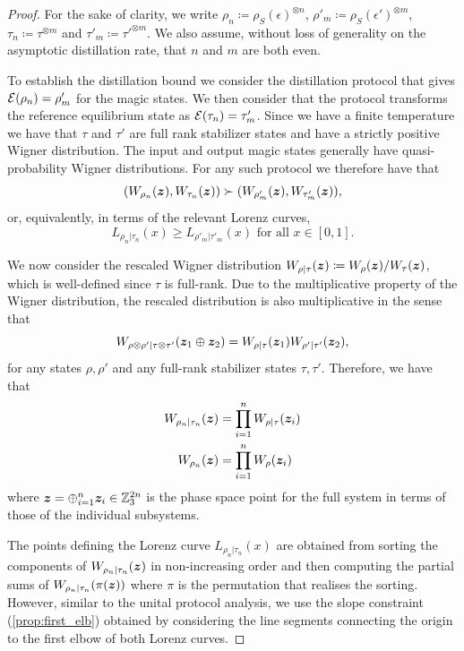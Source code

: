 \documentclass[pra,
aps,
twocolumn,
superscriptaddress,
groupedaddress,
nofootinbib,
reprint
]{revtex4-1}
\begin{document}
\begin{proof}	\label{thm:free-energy-bound-proof}
For the sake of clarity, we write $\rho_n \coloneqq \rho_S(\epsilon)^{\otimes n}$, $\rho'_m \coloneqq \rho_S(\epsilon')^{\otimes m}$, $\tau_n \coloneqq \tau^{\otimes m}$ and $\tau'_m \coloneqq \tau'^{\otimes m}$.  We also assume, without loss of generality on the asymptotic distillation rate, that $n$ and $m$ are both even.

To establish the distillation bound we consider the distillation protocol that gives ${\mathcal E}( \rho_n) = \rho'_m$ for the magic states. 
We then consider that the protocol transforms the reference equilibrium state as ${\mathcal E}( \tau_n) = \tau'_m$.
Since we have a finite temperature we have that $\tau$ and $\tau'$ are full rank stabilizer states and have a strictly positive Wigner distribution. The input and output magic states generally have quasi-probability Wigner distributions. 
For any such protocol we therefore have that
\begin{equation}
	( W_{\rho_n}(\bm{z}), W_{\tau_n}(\bm{z}) ) \succ ( W_{\rho'_m}(\bm{z}), W_{\tau'_m}(\bm{z}) ),
\end{equation}
or, equivalently, in terms of the relevant Lorenz curves,
\begin{equation}
	L_{\rho_n |\tau_n}(x) \ge L_{\rho'_m |\tau'_m}(x) \mbox{ for all } x \in [0,1].
\end{equation}

We now consider the rescaled Wigner distribution $W_{\rho | \tau}(\bm{z}) \coloneqq W_\rho(\bm{z})/W_\tau(\bm{z})$, which is well-defined since $\tau$ is full-rank. 
Due to the multiplicative property of the Wigner distribution, the rescaled distribution is also multiplicative in the sense that
\begin{equation}
	W_{\rho \otimes \rho' | \tau \otimes \tau'} (\bm{z}_1 \oplus \bm{z}_2) = W_{\rho | \tau}(\bm{z}_1)W_{\rho' | \tau'}(\bm{z}_2),
\end{equation}
for any states $\rho, \rho'$ and any full-rank stabilizer states $\tau, \tau'$.
Therefore, we have that
\begin{align}
	W_{\rho_n |\tau_n} (\bm{z}) &= \prod_{i=1}^n W_{\rho|\tau}(\bm{z}_i)\\
	W_{\rho_n } (\bm{z}) &= \prod_{i=1}^n W_\rho(\bm{z}_i)
\end{align}
where $\bm{z} = \oplus_{i=1}^n \bm{z}_i \in \mathbb{Z}_3^{2n}$ is the phase space point for the full system in terms of those of the individual subsystems.

The points defining the Lorenz curve $L_{\rho_n |\tau_n}(x)$ are obtained from sorting the components of $W_{\rho_n |\tau_n}(\bm{z})$ in non-increasing order and then computing the partial sums of $W_{\rho_n |\tau_n}(\pi(\bm{z}))$ where $\pi$ is the permutation that realises the sorting. 
However, similar to the unital protocol analysis, we use the slope constraint (\cref{prop:first_elb}) obtained by considering the line segments connecting the origin to the first elbow of both Lorenz curves.


\end{proof}
\end{document}
